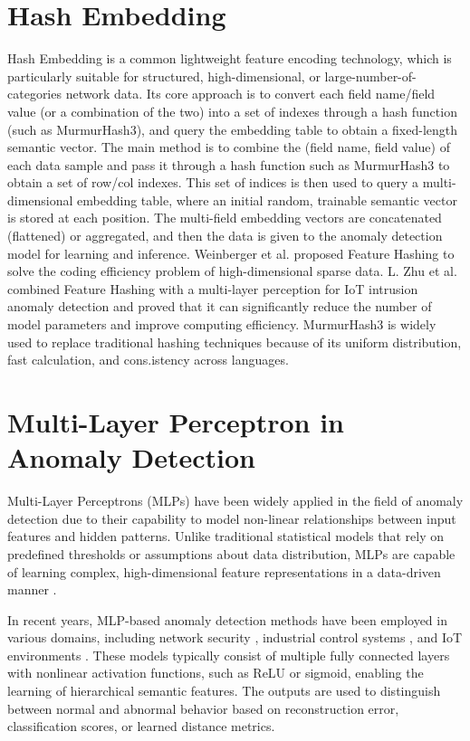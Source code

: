 \begin{ZhChapter}
    \section{Hash Embedding} \label{sec:hash_embedding}
    Hash Embedding is a common lightweight feature encoding technology, which is particularly suitable for structured, high-dimensional, or large-number-of-categories network data. Its core approach is to convert each field name/field value (or a combination of the two) into a set of indexes through a hash function (such as MurmurHash3), and query the embedding table to obtain a fixed-length semantic vector.
    The main method is to combine the (field name, field value) of each data sample and pass it through a hash function such as MurmurHash3 to obtain a set of row/col indexes. This set of indices is then used to query a multi-dimensional embedding table, where an initial random, trainable semantic vector is stored at each position. The multi-field embedding vectors are concatenated (flattened) or aggregated, and then the data is given to the anomaly detection model for learning and inference.
    Weinberger et al. \cite{pang2021deep} proposed Feature Hashing to solve the coding efficiency problem of high-dimensional sparse data. L. Zhu et al. \cite{weinberger2009feature} combined Feature Hashing with a multi-layer perception for IoT intrusion anomaly detection and proved that it can significantly reduce the number of model parameters and improve computing efficiency. MurmurHash3 is widely used to replace traditional hashing techniques because of its uniform distribution, fast calculation, and cons.istency across languages.


    \section{Multi-Layer Perceptron in Anomaly Detection}
    Multi-Layer Perceptrons (MLPs) have been widely applied in the field of anomaly detection due to their capability to model non-linear relationships between input features and hidden patterns. Unlike traditional statistical models that rely on predefined thresholds or assumptions about data distribution, MLPs are capable of learning complex, high-dimensional feature representations in a data-driven manner \cite{lecun2015deep}.

    In recent years, MLP-based anomaly detection methods have been employed in various domains, including network security \cite{moustafa2019new}, industrial control systems \cite{kim2020cyber}, and IoT environments \cite{nguyen2020autoencoder}. These models typically consist of multiple fully connected layers with nonlinear activation functions, such as ReLU or sigmoid, enabling the learning of hierarchical semantic features. The outputs are used to distinguish between normal and abnormal behavior based on reconstruction error, classification scores, or learned distance metrics.


\end{ZhChapter}
